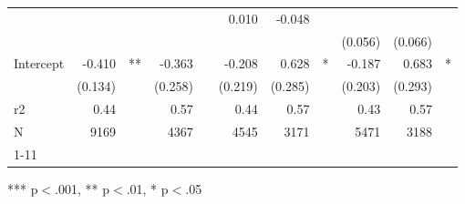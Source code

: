 \documentclass{article}
\begin{document}
\begin{table}[!h]
\begin{tabular}{lllllllllll}
  \multicolumn{1}{r}{} &
  \multicolumn{1}{l}{} &
  \multicolumn{1}{r}{} &
  \multicolumn{1}{r}{} &
  \multicolumn{1}{l}{} &
  \multicolumn{1}{r}{0.010} &
  \multicolumn{1}{r}{-0.048} &
  \multicolumn{1}{l}{} \\
\multicolumn{1}{l}{} &
  \multicolumn{1}{r}{} &
  \multicolumn{1}{l}{} &
  \multicolumn{1}{r}{} &
  \multicolumn{1}{l}{} &
  \multicolumn{1}{r}{} &
  \multicolumn{1}{r}{} &
  \multicolumn{1}{l}{} &
  \multicolumn{1}{r}{(0.056)} &
  \multicolumn{1}{r}{(0.066)} &
  \multicolumn{1}{l}{} \\
\multicolumn{1}{l}{Intercept} &
  \multicolumn{1}{r}{-0.410} &
  \multicolumn{1}{l}{**} &
  \multicolumn{1}{r}{-0.363} &
  \multicolumn{1}{l}{} &
  \multicolumn{1}{r}{-0.208} &
  \multicolumn{1}{r}{0.628} &
  \multicolumn{1}{l}{*} &
  \multicolumn{1}{r}{-0.187} &
  \multicolumn{1}{r}{0.683} &
  \multicolumn{1}{l}{*} \\
\multicolumn{1}{l}{} &
  \multicolumn{1}{r}{(0.134)} &
  \multicolumn{1}{l}{} &
  \multicolumn{1}{r}{(0.258)} &
  \multicolumn{1}{l}{} &
  \multicolumn{1}{r}{(0.219)} &
  \multicolumn{1}{r}{(0.285)} &
  \multicolumn{1}{l}{} &
  \multicolumn{1}{r}{(0.203)} &
  \multicolumn{1}{r}{(0.293)} &
  \multicolumn{1}{l}{} \\
\multicolumn{1}{l}{r2} &
  \multicolumn{1}{r}{0.44} &
  \multicolumn{1}{l}{} &
  \multicolumn{1}{r}{0.57} &
  \multicolumn{1}{l}{} &
  \multicolumn{1}{r}{0.44} &
  \multicolumn{1}{r}{0.57} &
  \multicolumn{1}{l}{} &
  \multicolumn{1}{r}{0.43} &
  \multicolumn{1}{r}{0.57} &
  \multicolumn{1}{l}{} \\
\multicolumn{1}{l}{N} &
  \multicolumn{1}{r}{9169} &
  \multicolumn{1}{l}{} &
  \multicolumn{1}{r}{4367} &
  \multicolumn{1}{l}{} &
  \multicolumn{1}{r}{4545} &
  \multicolumn{1}{r}{3171} &
  \multicolumn{1}{l}{} &
  \multicolumn{1}{r}{5471} &
  \multicolumn{1}{r}{3188} &
  \multicolumn{1}{l}{} \\
\cline{1-11}
\end{tabular}

\footnotesize{
*** p$<$.001, ** p$<$.01, * p$<$.05
}
\end{table}
\end{document}
